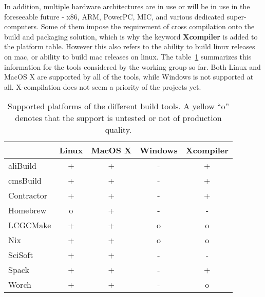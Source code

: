 \documentclass[12pt,a4paper]{article}
\begin{document}
In addition, multiple hardware architectures are in use or will be in use in the
foreseeable future - x86, ARM, PowerPC, MIC, and various dedicated
super-computers. Some of them impose the requirement of cross compilation onto
the build and packaging solution, which is why the keyword \textbf{Xcompiler}
is added to the platform table.  However this also refers to the ability to
build linux releases on mac, or ability to build mac releases on linux.
The table~\ref{tab:taxonomyPlatforms} summarizes this information for the tools
considered by the working group so far. Both Linux and MacOS X are supported by
all of the tools, while Windows is not supported at all. X-compilation does not
seem a priority of the projects yet.

\begin{table}
\centering
\begin{tabular}{lcccc}
& Linux & MacOS X & Windows & Xcompiler \\ \hline
aliBuild & \cellcolor{green} + & \cellcolor{green} + & \cellcolor{red} - & \cellcolor{green} +  \\
cmsBuild & \cellcolor{green} + & \cellcolor{green} + & \cellcolor{red} - & \cellcolor{green} +  \\
Contractor & \cellcolor{green} + & \cellcolor{green} + & \cellcolor{red} - & \cellcolor{green} + \\
Homebrew & \cellcolor{yellow} o & \cellcolor{green} + & \cellcolor{red} - & \cellcolor{red} -\\
LCGCMake & \cellcolor{green} + & \cellcolor{green} + & \cellcolor{yellow} o   & \cellcolor{yellow} o \\
Nix & \cellcolor{green} + & \cellcolor{green} + & \cellcolor{yellow} o  & \cellcolor{yellow} o \\
SciSoft &  \cellcolor{green} + & \cellcolor{green} + & \cellcolor{red} - & \cellcolor{red} - \\
Spack & \cellcolor{green} + & \cellcolor{green} + & \cellcolor{red} - & \cellcolor{green} +\\
Worch &  \cellcolor{green} + &  \cellcolor{green}  + & \cellcolor{red} -  &  \cellcolor{yellow} o
\end{tabular}
\caption{\label{tab:taxonomyPlatforms}Supported platforms of the different build tools. A yellow ``o'' denotes that the support is untested or not of production quality.}
\end{table}
\end{document}
